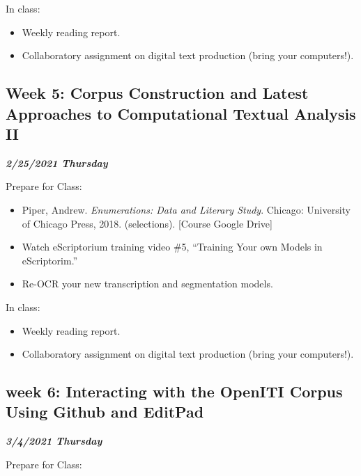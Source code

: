 \documentclass[
]{book}
\providecommand{\tightlist}{%
  \setlength{\itemsep}{0pt}\setlength{\parskip}{0pt}}
\begin{document}
In class:

\begin{itemize}
\tightlist
\item
  Weekly reading report.
\item
  Collaboratory assignment on digital text production (bring your computers!).
\end{itemize}

\hypertarget{week-5-corpus-construction-and-latest-approaches-to-computational-textual-analysis-ii}{%
\subsection{Week 5: Corpus Construction and Latest Approaches to Computational Textual Analysis II}\label{week-5-corpus-construction-and-latest-approaches-to-computational-textual-analysis-ii}}

\textbf{\emph{2/25/2021 Thursday}}

Prepare for Class:

\begin{itemize}
\tightlist
\item
  Piper, Andrew. \emph{Enumerations: Data and Literary Study}. Chicago: University of Chicago Press, 2018. (selections). {[}Course Google Drive{]}
\item
  Watch eScriptorium training video \#5, ``Training Your own Models in eScriptorim.''
\item
  Re-OCR your new transcription and segmentation models.
\end{itemize}

In class:

\begin{itemize}
\tightlist
\item
  Weekly reading report.
\item
  Collaboratory assignment on digital text production (bring your computers!).
\end{itemize}

\hypertarget{week-6-interacting-with-the-openiti-corpus-using-github-and-editpad}{%
\subsection{week 6: Interacting with the OpenITI Corpus Using Github and EditPad}\label{week-6-interacting-with-the-openiti-corpus-using-github-and-editpad}}

\textbf{\emph{3/4/2021 Thursday}}

Prepare for Class:
\end{document}
